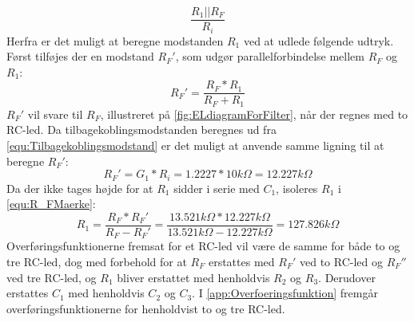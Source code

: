%
\begin{equation}
	\frac{R_1||R_F}{R_i}
\end{equation}
% 
Herfra er det muligt at beregne modstanden $R_1$ ved at udlede følgende udtryk. Først tilføjes der en modstand $R_F'$, som udgør parallelforbindelse mellem $R_F$ og $R_1$:
%
\begin{equation}
	R_F' = \frac{R_F*R_1}{R_F+R_1}
	\label{equ:R_FMaerke}
\end{equation}
%
$R_F'$ vil svare til $R_F$, illustreret på \autoref{fig:ELdiagramForFilter}, når der regnes med to RC-led. Da tilbagekoblingsmodstanden beregnes ud fra \autoref{equ:Tilbagekoblingsmodstand} er det muligt at anvende samme ligning til at beregne $R_F'$:
%
\begin{equation}
	R_F' = G_1*R_i = 1.2227*10k\Omega = 12.227k\Omega
\end{equation}
%
Da der ikke tages højde for at $R_1$ sidder i serie med $C_1$, isoleres $R_1$ i \autoref{equ:R_FMaerke}:
%
\begin{equation}
	R_1 = \frac{R_F*R_F'}{R_F-R_F'} = \frac{13.521k\Omega*12.227k\Omega}{13.521k\Omega-12.227k\Omega} = 127.826k\Omega
\end{equation}  
%
Overføringsfunktionerne fremsat for et RC-led vil være de samme for både to og tre RC-led, dog med forbehold for at $R_F$ erstattes med $R_F'$ ved to RC-led og $R_F''$ ved tre RC-led, og $R_1$ bliver erstattet med henholdvis $R_2$ og $R_3$. Derudover erstattes $C_1$ med henholdvis $C_2$ og $C_3$. I \autoref{app:Overfoeringsfunktion} fremgår overføringsfunktionerne for henholdvist to og tre RC-led.

